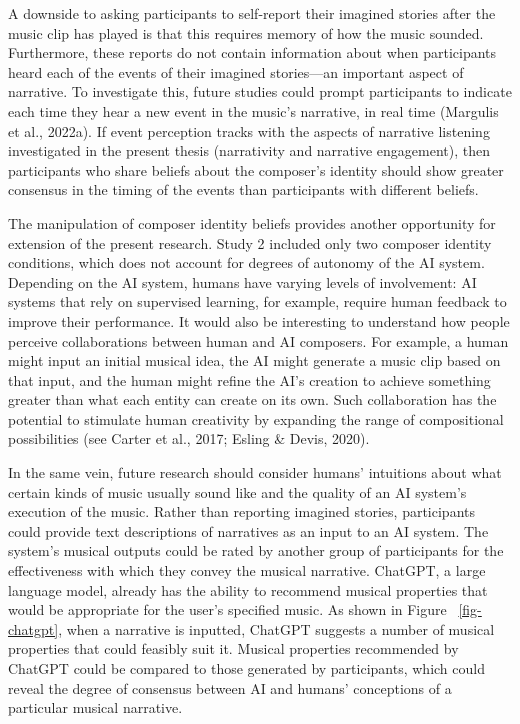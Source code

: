 \documentclass[12pt,twoside]{reedthesis}
\begin{document}
A downside to asking participants to self-report their imagined stories after the music clip has played is that this requires memory of how the music sounded. Furthermore, these reports do not contain information about when participants heard each of the events of their imagined stories—an important aspect of narrative. To investigate this, future studies could prompt participants to indicate each time they hear a new event in the music’s narrative, in real time (Margulis et al., 2022a). If event perception tracks with the aspects of narrative listening investigated in the present thesis (narrativity and narrative engagement), then participants who share beliefs about the composer’s identity should show greater consensus in the timing of the events than participants with different beliefs. 

The manipulation of composer identity beliefs provides another opportunity for extension of the present research. Study 2 included only two composer identity conditions, which does not account for degrees of autonomy of the AI system. Depending on the AI system, humans have varying levels of involvement: AI systems that rely on supervised learning, for example, require human feedback to improve their performance. It would also be interesting to understand how people perceive collaborations between human and AI composers. For example, a human might input an initial musical idea, the AI might generate a music clip based on that input, and the human might refine the AI’s creation to achieve something greater than what each entity can create on its own. Such collaboration has the potential to stimulate human creativity by expanding the range of compositional possibilities (see Carter et al., 2017; Esling \& Devis, 2020). 

In the same vein, future research should consider humans’ intuitions about what certain kinds of music usually sound like and the quality of an AI system’s execution of the music. Rather than reporting imagined stories, participants could provide text descriptions of narratives as an input to an AI system. The system’s musical outputs could be rated by another group of participants for the effectiveness with which they convey the musical narrative. ChatGPT, a large language model, already has the ability to recommend musical properties that would be appropriate for the user’s specified music. As shown in Figure ~\ref{fig-chatgpt}, when a narrative is inputted, ChatGPT suggests a number of musical properties that could feasibly suit it. Musical properties recommended by ChatGPT could be compared to those generated by participants, which could reveal the degree of consensus between AI and humans' conceptions of a particular musical narrative. 
\end{document}

